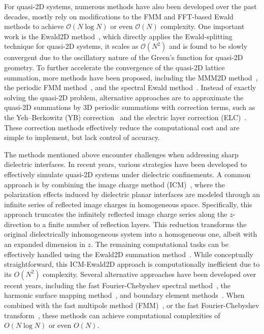 For quasi-2D systems,  numerous methods have also been developed over the past decades, mostly rely on modifications to the FMM and FFT-based Ewald methods to achieve $\mathcal{O}(N\log N)$ or even $\mathcal{O}(N)$ complexity.
One important work is the Ewald2D method~\cite{parry1975electrostatic}, which directly applies the Ewald-splitting technique for quasi-2D systems, it scales as $\mathcal{O}(N^2)$ and is found to be slowly convergent due to the oscillatory nature of the Green's function for quasi-2D geometry.
To further accelerate the convergence of the quasi-2D lattice summation, more methods have been proposed, including the MMM2D method~\cite{arnold2002mmm2d}, the periodic FMM method~\cite{yan2018flexibly}, and the spectral Ewald method~\cite{lindbo2012fast}.
Instead of exactly solving the quasi-2D problem, alternative approaches are to approximate the quasi-2D summations by 3D periodic summations with correction terms, such as the Yeh--Berkowitz (YB) correction~\cite{yeh1999ewald} and the  {electric layer correction (ELC)~\cite{arnold2002electrostatics}.}
These correction methods effectively reduce the computational cost and are simple to implement, but lack control of accuracy.

The methods mentioned above encounter challenges when addressing sharp dielectric interfaces. In recent years, various strategies have been developed to effectively simulate quasi-2D systems under dielectric confinements.
A common approach is by combining the image charge method (ICM)~\cite{jackson1999classical,frenkel2023understanding}, where the polarization effects induced by dielectric planar interfaces are modeled through an infinite series of reflected image charges in homogeneous space.
Specifically, this approach truncates the infinitely reflected image charge series along the $z$-direction to a finite number of reflection layers. 
This reduction transforms the original dielectrically inhomogeneous system into a homogeneous one, albeit with an expanded dimension in $z$.
The remaining computational tasks can be effectively handled using the Ewald2D summation method~\cite{parry1975electrostatic,zhonghanhu2014JCTC}. While conceptually straightforward, this ICM-Ewald2D approach is computationally inefficient due to its $O(N^2)$ complexity.
Several alternative approaches have been developed over recent years, including the fast Fourier-Chebyshev spectral method~\cite{maxian2021fast,gao2024fast}, the harmonic surface mapping method~\cite{liang2020harmonic,liang2022hsma}, and boundary element methods~\cite{barros2014efficient,nguyen2019incorporating}.
When combined with the fast multipole method (FMM)~\cite{greengard1987fast,kohnke2020gpu}, or the fast Fourier-Chebyshev transform~\cite{trefethen2000spectral}, these methods can achieve computational complexities of $ O(N\log N)$ or even $ O(N)$.

